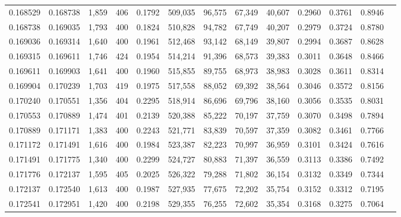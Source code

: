 \begin{tabular}{rrrrrrrrrrrrr}
0.168529 & 0.168738 & 1,859 & 406 &                                     0.1792 & 509,035 &  96,575 &  67,349 &  40,607 & 0.2960 & 0.3761 & 0.8946 \\
0.168738 & 0.169035 & 1,793 & 400 &                                     0.1824 & 510,828 &  94,782 &  67,749 &  40,207 & 0.2979 & 0.3724 & 0.8780 \\
0.169036 & 0.169314 & 1,640 & 400 &                                     0.1961 & 512,468 &  93,142 &  68,149 &  39,807 & 0.2994 & 0.3687 & 0.8628 \\
0.169315 & 0.169611 & 1,746 & 424 &                                     0.1954 & 514,214 &  91,396 &  68,573 &  39,383 & 0.3011 & 0.3648 & 0.8466 \\
0.169611 & 0.169903 & 1,641 & 400 &                                     0.1960 & 515,855 &  89,755 &  68,973 &  38,983 & 0.3028 & 0.3611 & 0.8314 \\
0.169904 & 0.170239 & 1,703 & 419 &                                     0.1975 & 517,558 &  88,052 &  69,392 &  38,564 & 0.3046 & 0.3572 & 0.8156 \\
0.170240 & 0.170551 & 1,356 & 404 &                                     0.2295 & 518,914 &  86,696 &  69,796 &  38,160 & 0.3056 & 0.3535 & 0.8031 \\
0.170553 & 0.170889 & 1,474 & 401 &                                     0.2139 & 520,388 &  85,222 &  70,197 &  37,759 & 0.3070 & 0.3498 & 0.7894 \\
0.170889 & 0.171171 & 1,383 & 400 &                                     0.2243 & 521,771 &  83,839 &  70,597 &  37,359 & 0.3082 & 0.3461 & 0.7766 \\
0.171172 & 0.171491 & 1,616 & 400 &                                     0.1984 & 523,387 &  82,223 &  70,997 &  36,959 & 0.3101 & 0.3424 & 0.7616 \\
0.171491 & 0.171775 & 1,340 & 400 &                                     0.2299 & 524,727 &  80,883 &  71,397 &  36,559 & 0.3113 & 0.3386 & 0.7492 \\
0.171776 & 0.172137 & 1,595 & 405 &                                     0.2025 & 526,322 &  79,288 &  71,802 &  36,154 & 0.3132 & 0.3349 & 0.7344 \\
0.172137 & 0.172540 & 1,613 & 400 &                                     0.1987 & 527,935 &  77,675 &  72,202 &  35,754 & 0.3152 & 0.3312 & 0.7195 \\
0.172541 & 0.172951 & 1,420 & 400 &                                     0.2198 & 529,355 &  76,255 &  72,602 &  35,354 & 0.3168 & 0.3275 & 0.7064 \\

\end{tabular}
